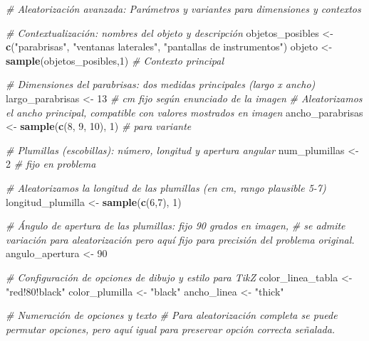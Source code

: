 \documentclass[
]{article}
\author{}
\date{\vspace{-2.5em}}
\newenvironment{Shaded}{\begin{snugshade}}{\end{snugshade}}
\newcommand{\CommentTok}[1]{\textcolor[rgb]{0.56,0.35,0.01}{\textit{#1}}}
\newcommand{\DecValTok}[1]{\textcolor[rgb]{0.00,0.00,0.81}{#1}}
\newcommand{\FunctionTok}[1]{\textcolor[rgb]{0.13,0.29,0.53}{\textbf{#1}}}
\newcommand{\NormalTok}[1]{#1}
\newcommand{\OtherTok}[1]{\textcolor[rgb]{0.56,0.35,0.01}{#1}}
\newcommand{\StringTok}[1]{\textcolor[rgb]{0.31,0.60,0.02}{#1}}
\begin{document}
\begin{Shaded}
\begin{Highlighting}[]
\CommentTok{\# Aleatorización avanzada: Parámetros y variantes para dimensiones y contextos}

\CommentTok{\# Contextualización: nombres del objeto y descripción}
\NormalTok{objetos\_posibles }\OtherTok{\textless{}{-}} \FunctionTok{c}\NormalTok{(}\StringTok{"parabrisas"}\NormalTok{, }\StringTok{"ventanas laterales"}\NormalTok{, }\StringTok{"pantallas de instrumentos"}\NormalTok{)}
\NormalTok{objeto }\OtherTok{\textless{}{-}} \FunctionTok{sample}\NormalTok{(objetos\_posibles,}\DecValTok{1}\NormalTok{) }\CommentTok{\# Contexto principal}

\CommentTok{\# Dimensiones del parabrisas: dos medidas principales (largo x ancho)}
\NormalTok{largo\_parabrisas }\OtherTok{\textless{}{-}} \DecValTok{13} \CommentTok{\# cm fijo según enunciado de la imagen}
\CommentTok{\# Aleatorizamos el ancho principal, compatible con valores mostrados en imagen}
\NormalTok{ancho\_parabrisas }\OtherTok{\textless{}{-}} \FunctionTok{sample}\NormalTok{(}\FunctionTok{c}\NormalTok{(}\DecValTok{8}\NormalTok{, }\DecValTok{9}\NormalTok{, }\DecValTok{10}\NormalTok{), }\DecValTok{1}\NormalTok{) }\CommentTok{\# para variante}

\CommentTok{\# Plumillas (escobillas): número, longitud y apertura angular}
\NormalTok{num\_plumillas }\OtherTok{\textless{}{-}} \DecValTok{2} \CommentTok{\# fijo en problema}

\CommentTok{\# Aleatorizamos la longitud de las plumillas (en cm, rango plausible 5{-}7)}
\NormalTok{longitud\_plumilla }\OtherTok{\textless{}{-}} \FunctionTok{sample}\NormalTok{(}\FunctionTok{c}\NormalTok{(}\DecValTok{6}\NormalTok{,}\DecValTok{7}\NormalTok{), }\DecValTok{1}\NormalTok{) }

\CommentTok{\# Ángulo de apertura de las plumillas: fijo 90 grados en imagen,}
\CommentTok{\# se admite variación para aleatorización pero aquí fijo para precisión del problema original.}
\NormalTok{angulo\_apertura }\OtherTok{\textless{}{-}} \DecValTok{90}

\CommentTok{\# Configuración de opciones de dibujo y estilo para TikZ}
\NormalTok{color\_linea\_tabla }\OtherTok{\textless{}{-}} \StringTok{"red!80!black"}
\NormalTok{color\_plumilla }\OtherTok{\textless{}{-}} \StringTok{"black"}
\NormalTok{ancho\_linea }\OtherTok{\textless{}{-}} \StringTok{"thick"}

\CommentTok{\# Numeración de opciones y texto}
\CommentTok{\# Para aleatorización completa se puede permutar opciones, pero aquí igual para preservar opción correcta señalada.}


\end{Highlighting}
\end{Shaded}
\end{document}
